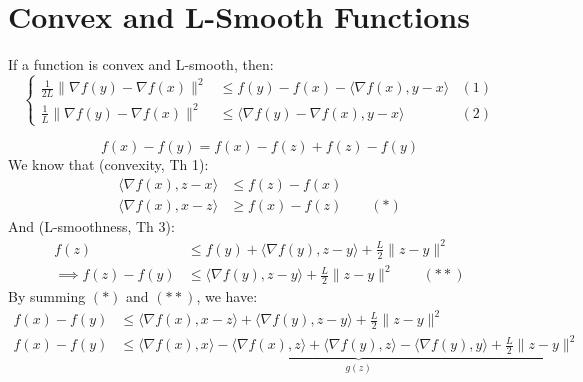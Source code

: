\section{Convex and L-Smooth Functions}

If a function is convex and L-smooth, then:
\[
\left\{\begin{aligned}
\frac{1}{2L}\lVert\nabla f(y)-\nabla f(x)\rVert^2&\le f(y)-f(x)-\bigl\langle\nabla f(x),y-x\bigr\rangle&(1)\\
\frac{1}{L}\lVert\nabla f(y)-\nabla f(x)\rVert^2&\le\bigl\langle\nabla f(y)-\nabla f(x),y-x\bigr\rangle&(2)
\end{aligned}\right.
\]

\Demo
\[
f(x)-f(y)=f(x)-f(z)+f(z)-f(y)
\]
We know that (convexity, Th 1):
\begin{align*}
\bigl\langle\nabla f(x),z-x\bigr\rangle&\le f(z)-f(x)\\
\bigl\langle\nabla f(x),x-z\bigr\rangle&\ge f(x)-f(z)\qquad(*)
\end{align*}
And (L-smoothness, Th 3):
\begin{align*}
f(z)&\le f(y)+\bigl\langle\nabla f(y),z-y\bigr\rangle+\frac{L}{2}\lVert z-y\rVert^2\\
\implies f(z)-f(y)&\le\bigl\langle\nabla f(y),z-y\bigr\rangle+\frac{L}{2}\lVert z-y\rVert^2\qquad(**)
\end{align*}
By summing $(*)$ and $(**)$, we have:
\begin{align*}
f(x)-f(y)&\le\bigl\langle\nabla f(x),x-z\bigr\rangle+\bigl\langle\nabla f(y),z-y\bigr\rangle+\frac{L}{2}\lVert z-y\rVert^2\\
f(x)-f(y)&\le\underbrace{\bigl\langle\nabla f(x),x\bigr\rangle-\bigl\langle\nabla f(x),z\bigr\rangle+\bigl\langle\nabla f(y),z\bigr\rangle-\bigl\langle\nabla f(y),y\bigr\rangle+\frac{L}{2}\lVert z-y\rVert^2}_{g(z)}
\end{align*}


